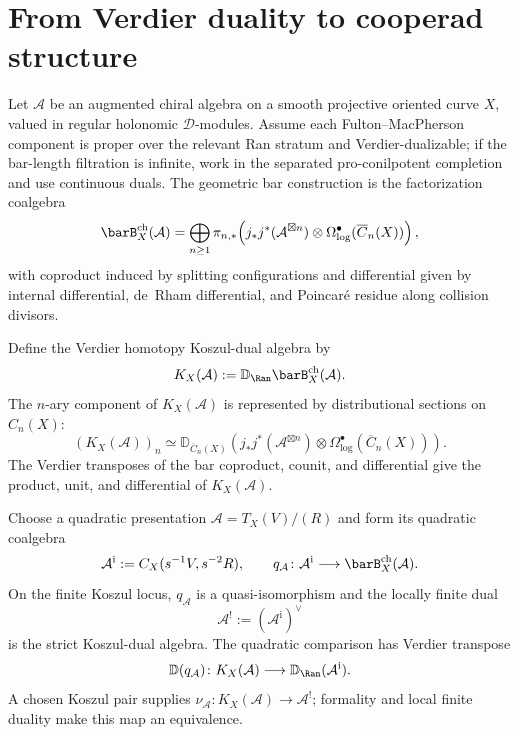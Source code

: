 \section{From Verdier duality to cooperad structure}

\begin{construction}\label{const:A-dual-intrinsic}
Let $\mathcal{A}$ be an augmented chiral algebra on a smooth
projective oriented curve $X$, valued in regular holonomic
$\mathcal{D}$-modules. Assume each Fulton--MacPherson component is
proper over the relevant Ran stratum and Verdier-dualizable; if the
bar-length filtration is infinite, work in the separated
pro-conilpotent completion and use continuous duals. The geometric
bar construction is the factorization coalgebra
\[
\barB_X^{\mathrm{ch}}(\mathcal{A})
=
\bigoplus_{n\geq 1}
\pi_{n,*}\!\left(
j_*j^*(\mathcal{A}^{\boxtimes n})
\otimes \Omega^\bullet_{\log}(\overline{C}_n(X))
\right),
\]
with coproduct induced by splitting configurations and differential
given by internal differential, de~Rham differential, and Poincar\'e
residue along collision divisors.

Define the Verdier homotopy Koszul-dual algebra by
\[
K_X(\mathcal A):=
\mathbb{D}_{\Ran}\barB_X^{\mathrm{ch}}(\mathcal{A}).
\]
The $n$-ary component of $K_X(\mathcal A)$ is
represented by distributional sections on $C_n(X)$:
\[
(K_X(\mathcal A))_n
\simeq
\mathbb{D}_{\overline{C}_n(X)}
\!\left(
j_*j^*(\mathcal{A}^{\boxtimes n})
\otimes \Omega^\bullet_{\log}(\overline{C}_n(X))
\right).
\]
The Verdier transposes of the bar coproduct, counit, and differential
give the product, unit, and differential of $K_X(\mathcal A)$.

Choose a quadratic presentation
$\mathcal A=T_X(V)/(R)$ and form its quadratic coalgebra
\[
\mathcal{A}^{\mathrm i}:=C_X(s^{-1}V,s^{-2}R),
\qquad
q_{\mathcal A}\colon\mathcal A^{\mathrm i}\longrightarrow
\barB_X^{\mathrm{ch}}(\mathcal A).
\]
On the finite Koszul locus, $q_{\mathcal A}$ is a quasi-isomorphism and
the locally finite dual
\[
\mathcal{A}^! := (\mathcal{A}^{\mathrm i})^\vee
\]
is the strict Koszul-dual algebra.  The quadratic comparison
has Verdier transpose
\[
\mathbb D(q_{\mathcal A})\colon K_X(\mathcal A)\longrightarrow
\mathbb D_{\Ran}(\mathcal A^{\mathrm i}).
\]
A chosen Koszul pair supplies
$\nu_{\mathcal A}\colon K_X(\mathcal A)\to\mathcal A^!$; formality and
local finite duality make this map an equivalence.
\end{construction}

